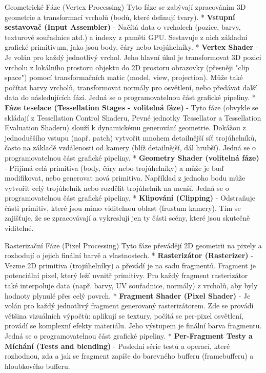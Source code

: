 \secc Geometrické Fáze (Vertex Processing) 
Tyto fáze se zabývají zpracováním 3D geometrie a transformací vrcholů (bodů, které definují tvary). 
\begitems
* {\bf Vstupní sestavovač (Input Assembler)} - Načítá data o vrcholech (pozice, barvy, texturové souřadnice atd.) a indexy z paměti GPU. Sestavuje z nich základní grafické primitivum, jako jsou body, čáry nebo trojúhelníky.
* {\bf Vertex Shader} - Je volán pro každý jednotlivý vrchol. Jeho hlavní úkol je transformovat 3D pozici vrcholu z lokálního prostoru objektu do 2D prostoru obrazovky (přesněji "clip space") pomocí transformačních matic (model, view, projection). Může také počítat barvy vrcholů, transformovat normály pro osvětlení, nebo předávat další data do následujících fází. Jedná se o programovatelnou část grafické pipeliny.
* {\bf Fáze teselace (Tessellation Stages - volitelná fáze)} - Tyto fáze (obvykle se skládají z Tessellation Control Shaderu, Pevné jednotky Tessellator a Tessellation Evaluation Shaderu) slouží k dynamickému generování geometrie. Dokážou z jednoduššího vstupu (např. patch) vytvořit mnohem detailnější síť trojúhelníků, často na základě vzdálenosti od kamery (blíž detailnější, dál hrubší). Jedná se o programovatelnou část grafické pipeliny.
* {\bf Geometry Shader (volitelná fáze)} - Přijímá celá primitiva (body, čáry nebo trojúhelníky) a může je buď modifikovat, nebo generovat nová primitiva. Například z jednoho bodu může vytvořit celý trojúhelník nebo rozdělit trojúhelník na menší. Jedná se o programovatelnou část grafické pipeliny.
* {\bf Klipování (Clipping)} - Odstraňuje části primitiv, které jsou mimo viditelnou oblast (frustum kamery). Tím se zajišťuje, že se zpracovávají a vykreslují jen ty části scény, které jsou skutečně viditelné.
\enditems

\secc Rasterizační Fáze (Pixel Processing)
Tyto fáze převádějí 2D geometrii na pixely a rozhodují o jejich finální barvě a vlastnostech.
\begitems
* {\bf Rasterizátor (Rasterizer)} - Vezme 2D primitiva (trojúhelníky) a převádí je na sadu fragmentů. Fragment je potenciální pixel, který leží uvnitř primitivy. Pro každý fragment rasterizátor také interpoluje data (např. barvy, UV souřadnice, normály) z vrcholů, aby byly hodnoty plynulé přes celý povrch.
* {\bf Fragment Shader (Pixel Shader)} - Je volán pro každý jednotlivý fragment generovaný rasterizátorem. Zde se provádí většina vizuálních výpočtů: aplikují se textury, počítá se per-pixel osvětlení, provádí se komplexní efekty materiálu. Jeho výstupem je finální barva fragmentu. Jedná se o programovatelnou část grafické pipeliny.
* {\bf Per-Fragment Testy a Míchání (Tests and blending)} - Poslední série testů a operací, které rozhodnou, zda a jak se fragment zapíše do barevného bufferu (framebufferu) a hloubkového bufferu.
\enditems




